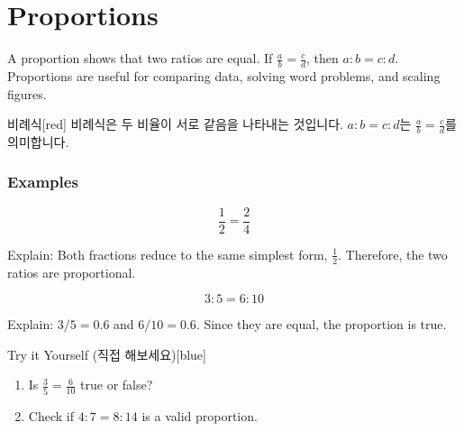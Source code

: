 \documentclass[12pt]{book}
\begin{document}
  \twosidedpaper
\section{Proportions}

A proportion shows that two ratios are equal.  
If $\tfrac{a}{b} = \tfrac{c}{d}$, then $a:b = c:d$.  
Proportions are useful for comparing data, solving word problems, and scaling figures.


\begin{flexbox}{비례식}[red]
비례식은 두 비율이 서로 같음을 나타내는 것입니다.  
$a:b = c:d$는 $\tfrac{a}{b} = \tfrac{c}{d}$를 의미합니다.
\end{flexbox}

\subsubsection*{Examples}

\[
\dfrac{1}{2} = \dfrac{2}{4}
\]

Explain: Both fractions reduce to the same simplest form, $\tfrac{1}{2}$.  
Therefore, the two ratios are proportional.



\[
3:5 = 6:10
\]

Explain: $3/5 = 0.6$ and $6/10 = 0.6$.  
Since they are equal, the proportion is true.

\begin{flexbox}{Try it Yourself (직접 해보세요)}[blue]
\begin{enumerate}
  \item Is $\tfrac{3}{5} = \tfrac{6}{10}$ true or false? \vspace*{20pt}
  \item Check if $4:7 = 8:14$ is a valid proportion. \vspace*{20pt}
\end{enumerate}
\end{flexbox}

  
  
  
\end{document}
